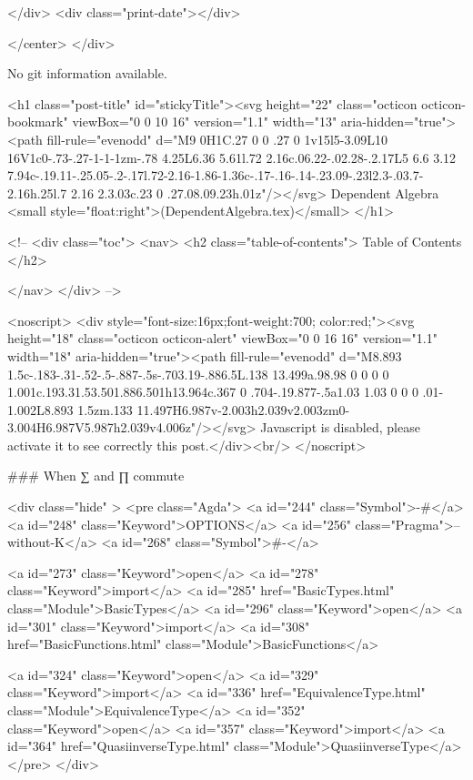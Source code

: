           
        </div>
        <div class="print-date"></div>
        
        
    </center>
  </div>

  
  No git information available.
  

  <h1 class="post-title" id="stickyTitle"><svg height="22" class="octicon octicon-bookmark" viewBox="0 0 10 16" version="1.1" width="13" aria-hidden="true"><path fill-rule="evenodd" d="M9 0H1C.27 0 0 .27 0 1v15l5-3.09L10 16V1c0-.73-.27-1-1-1zm-.78 4.25L6.36 5.61l.72 2.16c.06.22-.02.28-.2.17L5 6.6 3.12 7.94c-.19.11-.25.05-.2-.17l.72-2.16-1.86-1.36c-.17-.16-.14-.23.09-.23l2.3-.03.7-2.16h.25l.7 2.16 2.3.03c.23 0 .27.08.09.23h.01z"/></svg> Dependent Algebra <small style="float:right">(DependentAlgebra.tex)</small>
  </h1>

  <!-- 
  <div class="toc">
    <nav>
    <h2 class="table-of-contents"> Table of Contents </h2>
      

    </nav>
  </div>
   -->

  <noscript>
  <div style="font-size:16px;font-weight:700; color:red;"><svg height="18" class="octicon octicon-alert" viewBox="0 0 16 16" version="1.1" width="18" aria-hidden="true"><path fill-rule="evenodd" d="M8.893 1.5c-.183-.31-.52-.5-.887-.5s-.703.19-.886.5L.138 13.499a.98.98 0 0 0 0 1.001c.193.31.53.501.886.501h13.964c.367 0 .704-.19.877-.5a1.03 1.03 0 0 0 .01-1.002L8.893 1.5zm.133 11.497H6.987v-2.003h2.039v2.003zm0-3.004H6.987V5.987h2.039v4.006z"/></svg> Javascript is disabled, please activate it to see correctly this post.</div><br/>
  </noscript>

  ### When ∑ and ∏ commute


<div class="hide" >
<pre class="Agda">
<a id="244" class="Symbol">{-#</a> <a id="248" class="Keyword">OPTIONS</a> <a id="256" class="Pragma">--without-K</a> <a id="268" class="Symbol">#-}</a>

<a id="273" class="Keyword">open</a> <a id="278" class="Keyword">import</a> <a id="285" href="BasicTypes.html" class="Module">BasicTypes</a>
<a id="296" class="Keyword">open</a> <a id="301" class="Keyword">import</a> <a id="308" href="BasicFunctions.html" class="Module">BasicFunctions</a>

<a id="324" class="Keyword">open</a> <a id="329" class="Keyword">import</a> <a id="336" href="EquivalenceType.html" class="Module">EquivalenceType</a>
<a id="352" class="Keyword">open</a> <a id="357" class="Keyword">import</a> <a id="364" href="QuasiinverseType.html" class="Module">QuasiinverseType</a>
</pre>
</div>

